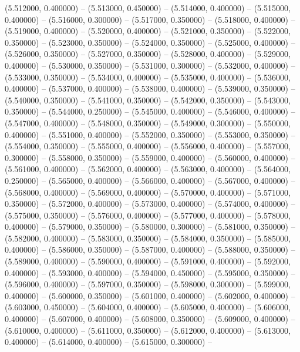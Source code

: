 (5.512000, 0.400000) -- 
(5.513000, 0.450000) -- 
(5.514000, 0.400000) -- 
(5.515000, 0.400000) -- 
(5.516000, 0.300000) -- 
(5.517000, 0.350000) -- 
(5.518000, 0.400000) -- 
(5.519000, 0.400000) -- 
(5.520000, 0.400000) -- 
(5.521000, 0.350000) -- 
(5.522000, 0.350000) -- 
(5.523000, 0.350000) -- 
(5.524000, 0.350000) -- 
(5.525000, 0.400000) -- 
(5.526000, 0.350000) -- 
(5.527000, 0.350000) -- 
(5.528000, 0.400000) -- 
(5.529000, 0.400000) -- 
(5.530000, 0.350000) -- 
(5.531000, 0.300000) -- 
(5.532000, 0.400000) -- 
(5.533000, 0.350000) -- 
(5.534000, 0.400000) -- 
(5.535000, 0.400000) -- 
(5.536000, 0.400000) -- 
(5.537000, 0.400000) -- 
(5.538000, 0.400000) -- 
(5.539000, 0.350000) -- 
(5.540000, 0.350000) -- 
(5.541000, 0.350000) -- 
(5.542000, 0.350000) -- 
(5.543000, 0.350000) -- 
(5.544000, 0.250000) -- 
(5.545000, 0.400000) -- 
(5.546000, 0.400000) -- 
(5.547000, 0.400000) -- 
(5.548000, 0.350000) -- 
(5.549000, 0.300000) -- 
(5.550000, 0.400000) -- 
(5.551000, 0.400000) -- 
(5.552000, 0.350000) -- 
(5.553000, 0.350000) -- 
(5.554000, 0.350000) -- 
(5.555000, 0.400000) -- 
(5.556000, 0.400000) -- 
(5.557000, 0.300000) -- 
(5.558000, 0.350000) -- 
(5.559000, 0.400000) -- 
(5.560000, 0.400000) -- 
(5.561000, 0.400000) -- 
(5.562000, 0.400000) -- 
(5.563000, 0.400000) -- 
(5.564000, 0.250000) -- 
(5.565000, 0.400000) -- 
(5.566000, 0.400000) -- 
(5.567000, 0.400000) -- 
(5.568000, 0.400000) -- 
(5.569000, 0.400000) -- 
(5.570000, 0.400000) -- 
(5.571000, 0.350000) -- 
(5.572000, 0.400000) -- 
(5.573000, 0.400000) -- 
(5.574000, 0.400000) -- 
(5.575000, 0.350000) -- 
(5.576000, 0.400000) -- 
(5.577000, 0.400000) -- 
(5.578000, 0.400000) -- 
(5.579000, 0.350000) -- 
(5.580000, 0.300000) -- 
(5.581000, 0.350000) -- 
(5.582000, 0.400000) -- 
(5.583000, 0.350000) -- 
(5.584000, 0.350000) -- 
(5.585000, 0.400000) -- 
(5.586000, 0.350000) -- 
(5.587000, 0.400000) -- 
(5.588000, 0.350000) -- 
(5.589000, 0.400000) -- 
(5.590000, 0.400000) -- 
(5.591000, 0.400000) -- 
(5.592000, 0.400000) -- 
(5.593000, 0.400000) -- 
(5.594000, 0.450000) -- 
(5.595000, 0.350000) -- 
(5.596000, 0.400000) -- 
(5.597000, 0.350000) -- 
(5.598000, 0.300000) -- 
(5.599000, 0.400000) -- 
(5.600000, 0.350000) -- 
(5.601000, 0.400000) -- 
(5.602000, 0.400000) -- 
(5.603000, 0.450000) -- 
(5.604000, 0.400000) -- 
(5.605000, 0.400000) -- 
(5.606000, 0.400000) -- 
(5.607000, 0.400000) -- 
(5.608000, 0.350000) -- 
(5.609000, 0.400000) -- 
(5.610000, 0.400000) -- 
(5.611000, 0.350000) -- 
(5.612000, 0.400000) -- 
(5.613000, 0.400000) -- 
(5.614000, 0.400000) -- 
(5.615000, 0.300000) -- 
